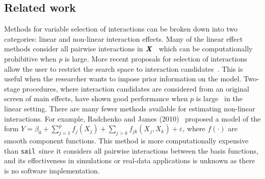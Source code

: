 \documentclass[a4paper,fleqn]{cas-sc}
\newcommand{\sail}{\texttt{sail}}
\newcommand{\bX}{\textbf{\emph{X}}}
\newcommand{\balpha}{\boldsymbol{\alpha}}
\newcommand{\mb}[1]{\mathbf{#1}}
\begin{document}
\subsection{Related work}
Methods for variable selection of interactions can be broken down into two categories: linear and non-linear interaction effects.
Many of the linear effect methods consider all pairwise interactions in $\bX$~\citep{zhao2009composite,choi2010variable,bien2013lasso, she2014group} which can be computationally prohibitive when $p$ is large. 
More recent proposals for selection of interactions allow the user to restrict the search space to interaction candidates~\citep{lim2015learning,haris2016convex}. 
This is useful when the researcher wants to impose prior information on the model.
Two-stage procedures, where interaction candidates are considered from an original screen of main effects, have shown good performance when $p$ is large~\citep{hao2018model,shah2016modelling} in the linear setting.
There are many fewer methods available for estimating non-linear interactions. 
For example, Radchenko and James (2010)~\citep{radchenko2010variable} proposed a model of the form $Y = \beta_0 + \sum_{j=1}^{p} f_j(X_j) + \sum_{j>k}f_{jk}(X_j, X_k) + \varepsilon$, where $f(\cdot)$ are smooth component functions. 
This method is more computationally expensive than \sail ~since it considers all pairwise interactions between the basis functions, and its effectiveness in simulations or real-data applications is unknown as there is no software implementation.

\end{document}
